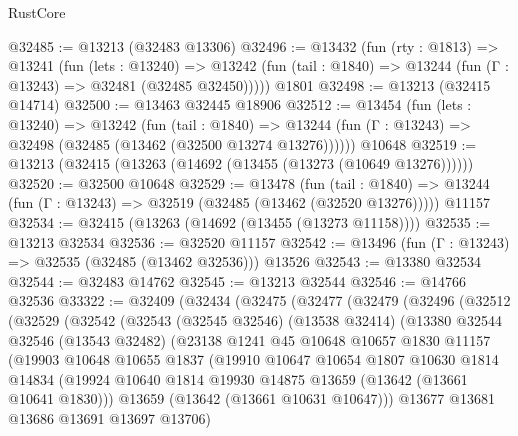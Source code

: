 \begin{lexlean}{RustCore}
\begin{coremodule}
@32485 := @13213 (@32483 @13306)
@32496 := @13432
    (fun (rty : @1813) =>
    @13241
      (fun (lets : @13240) =>
      @13242 (fun (tail : @1840) => @13244 (fun (Γ : @13243) => @32481 (@32485 @32450)))))
    @1801
@32498 := @13213 (@32415 @14714)
@32500 := @13463 @32445 @18906
@32512 := @13454
    (fun (lets : @13240) =>
    @13242
      (fun (tail : @1840) =>
      @13244 (fun (Γ : @13243) => @32498 (@32485 (@13462 (@32500 @13274 @13276))))))
    @10648
@32519 := @13213 (@32415 (@13263 (@14692 (@13455 (@13273 (@10649 @13276))))))
@32520 := @32500 @10648
@32529 := @13478
    (fun (tail : @1840) => @13244 (fun (Γ : @13243) => @32519 (@32485 (@13462 (@32520 @13276)))))
    @11157
@32534 := @32415 (@13263 (@14692 (@13455 (@13273 @11158))))
@32535 := @13213 @32534
@32536 := @32520 @11157
@32542 := @13496 (fun (Γ : @13243) => @32535 (@32485 (@13462 @32536))) @13526
@32543 := @13380 @32534
@32544 := @32483 @14762
@32545 := @13213 @32544
@32546 := @14766 @32536
@33322 := @32409
    (@32434
      (@32475
        (@32477
          (@32479
            (@32496
              (@32512
                (@32529
                  (@32542
                    (@32543
                      (@32545 @32546)
                      (@13538 @32414)
                      (@13380
                        @32544
                        @32546
                        (@13543 @32482)
                        (@23138
                          @1241
                          @45
                          @10648
                          @10657
                          @1830
                          @11157
                          (@19903
                            @10648
                            @10655
                            @1837
                            (@19910
                              @10647
                              @10654
                              @1807
                              @10630
                              @1814
                              @14834
                              (@19924
                                @10640
                                @1814
                                @19930
                                @14875
                                @13659
                                (@13642 (@13661 @10641 @1830)))
                              @13659
                              (@13642 (@13661 @10631 @10647)))
                            @13677
                            @13681
                            @13686
                            @13691
                            @13697
                            @13706)

\end{coremodule}
\end{lexlean}
